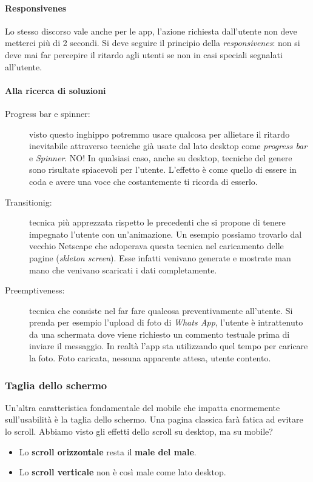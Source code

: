 			\paragraph{Responsivenes}
				Lo stesso discorso vale anche per le app, l'azione richiesta dall'utente non deve metterci più di 2 secondi. Si deve seguire il principio della \emph{responsivenes}: non si deve mai far percepire il ritardo agli utenti se non in casi speciali segnalati all'utente.
				
			\paragraph{Alla ricerca di soluzioni}
				\begin{description}
					\item[Progress bar e spinner:] visto questo inghippo potremmo usare qualcosa per allietare il ritardo inevitabile attraverso tecniche già usate dal lato desktop come \emph{progress bar} e \emph{Spinner}. NO! In qualsiasi caso, anche su desktop, tecniche del genere sono risultate spiacevoli per l'utente. L'effetto è come quello di essere in coda e avere una voce che costantemente ti ricorda di esserlo.
					\item[Transitionig:] tecnica più apprezzata rispetto le precedenti che si propone di tenere impegnato l'utente con un'animazione. Un esempio possiamo trovarlo dal vecchio Netscape che adoperava questa tecnica nel caricamento delle pagine (\emph{skleton screen}). Esse infatti venivano generate e mostrate man mano che venivano scaricati i dati completamente.
					\item[Preemptiveness:] tecnica che consiste nel far fare qualcosa preventivamente all'utente. Si prenda per esempio l'upload di foto di \emph{Whats App}, l'utente è intrattenuto da una schermata dove viene richiesto un commento testuale prima di inviare il messaggio. In realtà l'app sta utilizzando quel tempo per caricare la foto. Foto caricata, nessuna apparente attesa, utente contento.
				\end{description}
				
		\subsubsection{Taglia dello schermo}
			Un'altra caratteristica fondamentale del mobile che impatta enormemente sull'usabilità è la taglia dello schermo. Una pagina classica farà fatica ad evitare lo scroll. Abbiamo visto gli effetti dello scroll su desktop, ma su mobile?
			\begin{itemize}
				\item Lo \textbf{scroll orizzontale} resta il \textbf{male del male}.
				\item Lo \textbf{scroll verticale} non è così male come lato desktop.
			\end{itemize}
			
